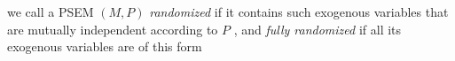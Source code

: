 we call a PSEM $(M, P)$
%
\emph{randomized} if it contains 
such exogenous variables that are mutually independent according to $P$
{%
    \unskip, and \emph{fully randomized} if {all} its exogenous variables are of this form
}%
